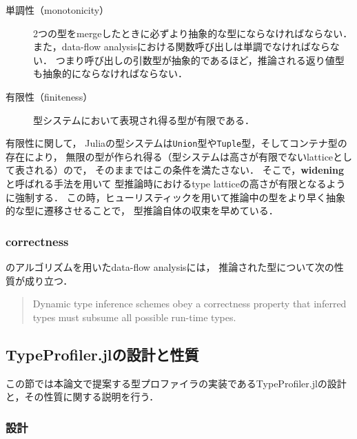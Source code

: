 \begin{description}
  \item [単調性（monotonicity）]
        2つの型をmergeしたときに必ずより抽象的な型にならなければならない．
        また，data-flow analysisにおける関数呼び出しは単調でなければならない．
        つまり呼び出しの引数型が抽象的であるほど，推論される返り値型も抽象的にならなければならない．
  \item [有限性（finiteness）] 型システムにおいて表現され得る型が有限である．
\end{description}

有限性に関して，
Juliaの型システムは\verb|Union|型や\verb|Tuple|型，そしてコンテナ型の存在により，
無限の型が作られ得る（型システムは高さが有限でないlatticeとして表される）ので，
そのままではこの条件を満たさない．
そこで，\textbf{widening}と呼ばれる手法を用いて
型推論時におけるtype latticeの高さが有限となるように強制する．
この時，ヒューリスティックを用いて推論中の型をより早く抽象的な型に遷移させることで，
型推論自体の収束を早めている．

\subsubsection{correctness} \label{subsubsection:inference-correctness}

\cite{graph-free-data-flow-analysis}のアルゴリズムを用いたdata-flow analysisには，
推論された型について次の性質が成り立つ\cite{jeff-master}．

\begin{quote}
  Dynamic type inference schemes obey a correctness property that inferred types
  must subsume all possible run-time types.
\end{quote}


\subsection{TypeProfiler.jlの設計と性質}

この節では本論文で提案する型プロファイラの実装であるTypeProfiler.jlの設計と，その性質に関する説明を行う．

\subsubsection{設計}


